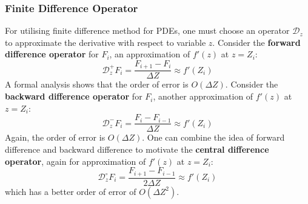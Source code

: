 \documentclass[../dissertation.tex]{subfiles}
\begin{document}
\subsubsection{Finite Difference Operator}
For utilising finite difference method for PDEs, one must choose an operator $\mathcal{D}_z$ to approximate the derivative with respect to variable $z$.
Consider the \textbf{forward difference operator} for $F_i$, an approximation of $f'(z)$ at $z = Z_i$:
\begin{equation}
    \mathcal{D}_z^+ F_{i} = \frac{F_{i+1} - F_{i}}{\Delta Z} \approx f'\left( Z_i \right)
\end{equation}
A formal analysis shows that the order of error is $O\left( \Delta Z \right)$.
Consider the \textbf{backward difference operator} for $F_i$, another approximation of $f'(z)$ at $z = Z_i$:
\begin{equation}
    \mathcal{D}_z^- F_{i} = \frac{F_{i} - F_{i-1}}{\Delta Z} \approx f'\left( Z_i \right)
\end{equation}
Again, the order of error is $O\left( \Delta Z \right)$.
One can combine the idea of forward difference and backward difference to motivate the \textbf{central difference operator}, again for approximation of $f'(z)$ at $z = Z_i$:
\begin{equation}
    \mathcal{D}_z^\circ F_{i} = \frac{F_{i+1} - F_{i-1}}{2 \Delta Z} \approx f'\left( Z_i \right)
\end{equation}
which has a better order of error of $O\left( \Delta Z^2 \right)$.
\end{document}

